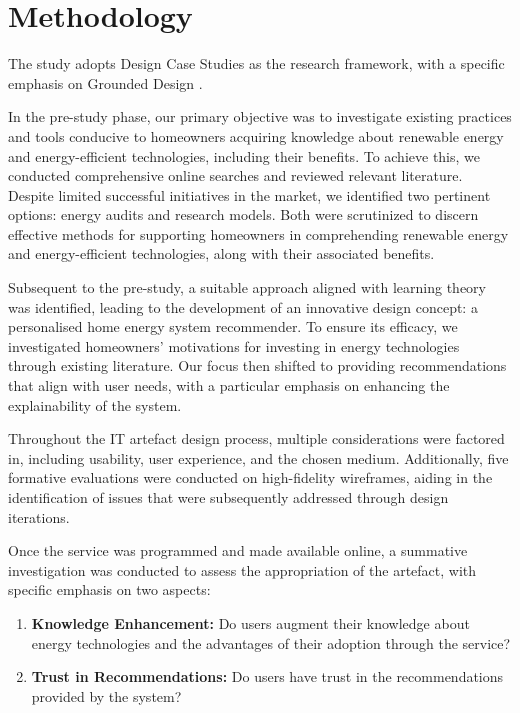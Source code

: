 \chapter{Methodology}

The study adopts Design Case Studies \cite{dcs} as the research framework, with a specific emphasis on Grounded Design \cite{Stevens2018}.

In the pre-study phase, our primary objective was to investigate existing practices and tools conducive to homeowners acquiring knowledge about renewable energy and energy-efficient technologies, including their benefits. 
To achieve this, we conducted comprehensive online searches and reviewed relevant literature. Despite limited successful initiatives in the market, we identified two pertinent options: energy audits and research models. 
Both were scrutinized to discern effective methods for supporting homeowners in comprehending renewable energy and energy-efficient technologies, along with their associated benefits.

Subsequent to the pre-study, a suitable approach aligned with learning theory was identified, leading to the development of an innovative design concept: a personalised home energy system recommender. 
To ensure its efficacy, we investigated homeowners' motivations for investing in energy technologies through existing literature. 
Our focus then shifted to providing recommendations that align with user needs, with a particular emphasis on enhancing the explainability of the system.

Throughout the IT artefact design process, multiple considerations were factored in, including usability, user experience, and the chosen medium. 
Additionally, five formative evaluations were conducted on high-fidelity wireframes, aiding in the identification of issues that were subsequently addressed through design iterations.

Once the service was programmed and made available online, a summative investigation was conducted to assess the appropriation of the artefact, with specific emphasis on two aspects:

\begin{enumerate}
    \item \textbf{Knowledge Enhancement:} Do users augment their knowledge about energy technologies and the advantages of their adoption through the service?
    \item \textbf{Trust in Recommendations:} Do users have trust in the recommendations provided by the system?
\end{enumerate}

